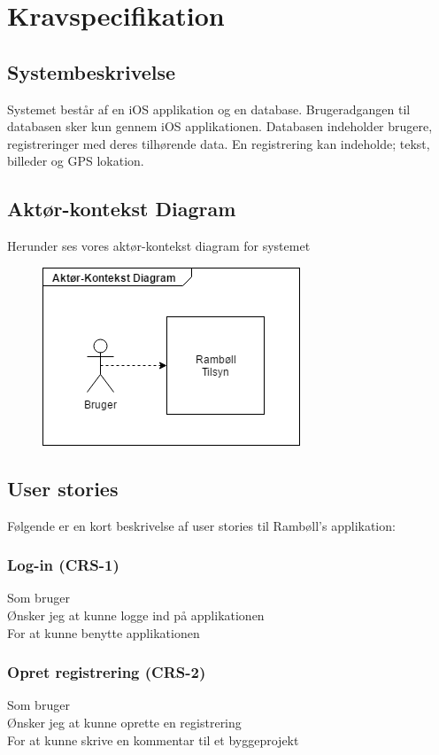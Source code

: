 	\chapter{Kravspecifikation}
	
	\section{Systembeskrivelse}
	Systemet består af en iOS applikation og en database. Brugeradgangen til databasen sker kun gennem iOS applikationen.
	Databasen indeholder brugere, registreringer med deres tilhørende data.
	En registrering kan indeholde; tekst, billeder og GPS lokation. \\
	
	\section{Aktør-kontekst Diagram}
	Herunder ses vores aktør-kontekst diagram for systemet
	\begin{figure}[h!]
		\centering
		\includegraphics[width=0.5\linewidth]{Kravspecifikation/AktoerDiagram}
	\end{figure}
		
	\section{User stories} 
	Følgende er en kort beskrivelse af user stories til Rambøll's applikation:

	\subsection*{Log-in (CRS-1)}
	Som bruger\\
	Ønsker jeg at kunne logge ind på applikationen\\
	For at kunne benytte applikationen
	
	\subsection*{Opret registrering (CRS-2)}
	Som bruger\\
	Ønsker jeg at kunne oprette en registrering\\
	For at kunne skrive en kommentar til et byggeprojekt
	
